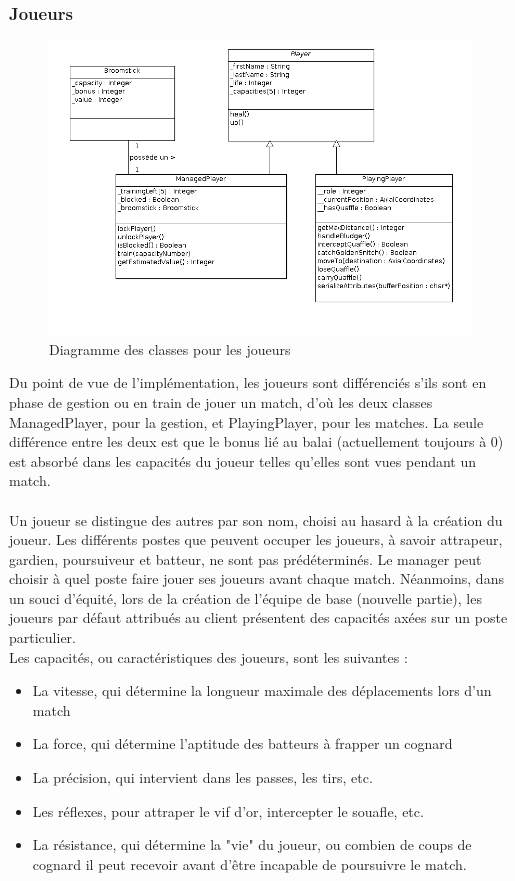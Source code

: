 \documentclass[a4paper,titlepage]{scrreprt}
\begin{document}
      \subsubsection{Joueurs}
          \begin{figure}[H]
          \center
          \includegraphics[scale=0.4]{uml/class/Players.png}
         \caption{Diagramme des classes pour les joueurs}
         \end{figure}

        Du point de vue de l'implémentation, les joueurs sont différenciés s'ils sont en phase de gestion ou en train de jouer un match, d'où les deux classes ManagedPlayer, pour la gestion, et PlayingPlayer, pour les matches. La seule différence entre les deux est que le bonus lié au balai (actuellement toujours à 0) est absorbé dans les capacités du joueur telles qu'elles sont vues pendant un match.\\
\\
        Un joueur se distingue des autres par son nom, choisi au hasard à la création du joueur. Les différents postes que peuvent occuper les joueurs, à savoir attrapeur, gardien, poursuiveur et batteur, ne sont pas prédéterminés. Le manager peut choisir à quel poste faire jouer ses joueurs avant chaque match. Néanmoins, dans un souci d'équité, lors de la création de l'équipe de base (nouvelle partie), les joueurs par défaut attribués au client présentent des capacités axées sur un poste particulier. \\

        Les capacités, ou caractéristiques des joueurs, sont les suivantes :
        \begin{itemize}
        \item La vitesse, qui détermine la longueur maximale des déplacements lors d'un match
        \item La force, qui détermine l'aptitude des batteurs à frapper un cognard
        \item La précision, qui intervient dans les passes, les tirs, etc.
        \item Les réflexes, pour attraper le vif d'or, intercepter le souafle, etc.
        \item La résistance, qui détermine la "vie" du joueur, ou combien de coups de cognard il peut recevoir avant d'être incapable de poursuivre le match.
        \end{itemize}
\end{document}
